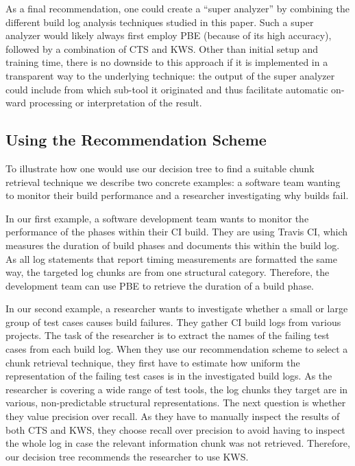 As a final recommendation, one could create a ``super analyzer'' by
combining the different build log analysis techniques studied in this
paper.
Such a super analyzer would likely always first employ PBE
(because of its high accuracy), followed by a combination of CTS and
KWS\@.
Other than initial setup and training time, there is no
downside to this approach if it is implemented in a transparent way to
the underlying technique: the output of the super analyzer could
include from which sub-tool it originated and thus facilitate
automatic on-ward processing or interpretation of the result.


\subsection{Using the Recommendation Scheme}

To illustrate how one would use our decision tree to find a suitable
chunk retrieval technique we describe two concrete examples: a software
team
wanting to monitor their build performance and a
researcher investigating why builds fail.

In our first example, a software development team wants to monitor
the performance of the phases within their CI build.
They are using
Travis CI, which measures the duration of build phases and documents
this within the build log.
As all log statements that report timing
measurements are formatted the same way, the targeted log chunks are
from one structural category.
Therefore, the development team can use
PBE to retrieve the duration of a build phase.

In our second example, a researcher wants to investigate whether a small or large group of test cases
causes build failures.
They gather
CI build logs from various projects.
The task of the researcher is to extract the names of the
failing test cases from each build log.
When they use our
recommendation scheme to select a chunk retrieval technique, they
first have to estimate how uniform the representation of the failing
test cases is in the investigated build logs.
As the researcher is
covering a wide range of test tools, the
log chunks they target are in various, non-predictable structural
representations.
The next question is whether they value precision
over recall.
As they have to manually inspect the results of both CTS
and KWS, they choose recall over precision to avoid having to inspect
the whole log in case the relevant information chunk was not
retrieved.
Therefore, our decision tree recommends the researcher to use KWS\@.

